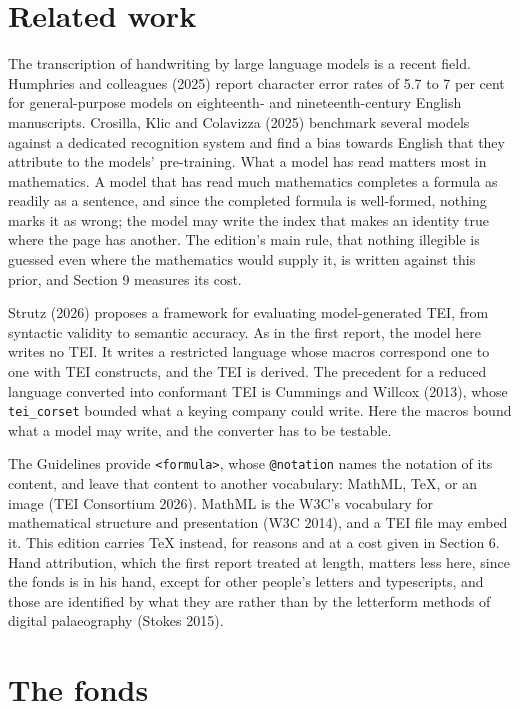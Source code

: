 \documentclass[11pt]{article}
\begin{document}
\section{Related work}

The transcription of handwriting by large language models is a recent field. Humphries and colleagues (2025) report character error rates of 5.7 to 7 per cent for general-purpose models on eighteenth- and nineteenth-century English manuscripts. Crosilla, Klic and Colavizza (2025) benchmark several models against a dedicated recognition system and find a bias towards English that they attribute to the models' pre-training. What a model has read matters most in mathematics. A model that has read much mathematics completes a formula as readily as a sentence, and since the completed formula is well-formed, nothing marks it as wrong; the model may write the index that makes an identity true where the page has another. The edition's main rule, that nothing illegible is guessed even where the mathematics would supply it, is written against this prior, and Section 9 measures its cost.

Strutz (2026) proposes a framework for evaluating model-generated TEI, from syntactic validity to semantic accuracy. As in the first report, the model here writes no TEI. It writes a restricted language whose macros correspond one to one with TEI constructs, and the TEI is derived. The precedent for a reduced language converted into conformant TEI is Cummings and Willcox (2013), whose \texttt{tei\_corset} bounded what a keying company could write. Here the macros bound what a model may write, and the converter has to be testable.

The Guidelines provide \texttt{<formula>}, whose \texttt{@notation} names the notation of its content, and leave that content to another vocabulary: MathML, TeX, or an image (TEI Consortium 2026). MathML is the W3C's vocabulary for mathematical structure and presentation (W3C 2014), and a TEI file may embed it. This edition carries TeX instead, for reasons and at a cost given in Section 6. Hand attribution, which the first report treated at length, matters less here, since the fonds is in his hand, except for other people's letters and typescripts, and those are identified by what they are rather than by the letterform methods of digital palaeography (Stokes 2015).

\section{The fonds}
\end{document}
